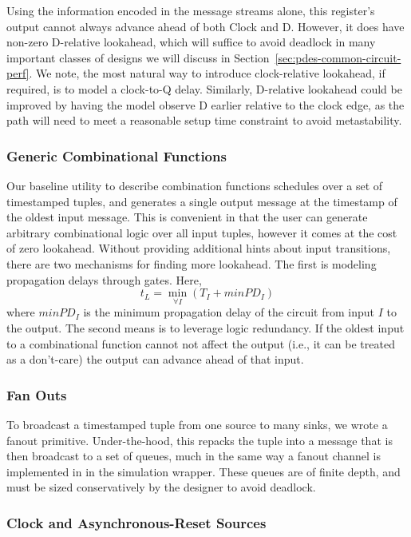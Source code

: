 Using the information encoded in the message streams alone, this register's
output cannot always advance ahead of both Clock and D. However, it does have non-zero D-relative lookahead, which will suffice to avoid
deadlock in many important classes of designs we will discuss in
Section~\ref{sec:pdes-common-circuit-perf}.  We note, the most natural way to
introduce clock-relative lookahead, if required, is to model a clock-to-Q
delay. Similarly, D-relative lookahead could be improved by having the model
observe D earlier relative to the clock edge, as the path will need to meet
a reasonable setup time constraint to avoid metastability.

\subsubsection{Generic Combinational Functions}
Our baseline utility to describe combination functions schedules over a set of
timestamped tuples, and generates a single output message at the timestamp of
the oldest input message. This is convenient in that the user can generate
arbitrary combinational logic over all input tuples, however it comes at the
cost of zero lookahead. Without providing additional hints about input transitions, there are two
mechanisms for finding more lookahead.  The first is modeling propagation
delays through gates. Here, $$t_L = \min_{\forall I} (T_{I} + minPD_{I})$$
where $minPD_{I}$ is the minimum propagation delay of the circuit from input $I$ to
the output.  The second means is to leverage logic redundancy. If the oldest
input to a combinational function cannot not affect the output (i.e., it can be
treated as a don't-care) the output can advance ahead of that input.

\subsubsection{Fan Outs}
To broadcast a timestamped tuple from one source to many sinks, we wrote a fanout
primitive. Under-the-hood, this repacks the tuple into a message that is then
broadcast to a set of queues, much in the same way a fanout channel is
implemented in in the simulation wrapper. These queues are of finite depth, and
must be sized conservatively by the designer to avoid deadlock.

\subsubsection{Clock and Asynchronous-Reset Sources}

